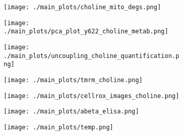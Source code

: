 \begin{figure}[ht]
    \begin{subfigure}[t]{.25\textwidth}
        \caption{}
        \texttt{[image: ./main\_plots/choline\_mito\_degs.png]}        
    \end{subfigure}   
    \begin{subfigure}[t]{.1\textwidth}
        \caption{}
        \texttt{[image: ./main\_plots/pca\_plot\_y622\_choline\_metab.png]}        
    \end{subfigure} 
    \begin{subfigure}[t]{.17\textwidth}
        \caption{}
        \texttt{[image: ./main\_plots/uncoupling\_choline\_quantification.png]}        
    \end{subfigure}    
    \begin{subfigure}[t]{.37\textwidth}
        \caption{}
        \texttt{[image: ./main\_plots/tmrm\_choline.png]}        
    \end{subfigure}  


    \begin{subfigure}[t]{.37\textwidth}
        \caption{}
        \texttt{[image: ./main\_plots/cellrox\_images\_choline.png]}        
    \end{subfigure}
    \begin{subfigure}[t]{.4\textwidth}
        \caption{}
        \texttt{[image: ./main\_plots/abeta\_elisa.png]}        
    \end{subfigure}  
    \begin{subfigure}[t]{.15\textwidth}
        \caption{}
        \texttt{[image: ./main\_plots/temp.png]}        
    \end{subfigure}  



\end{figure}
